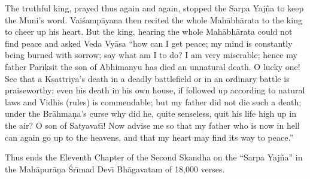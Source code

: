 The truthful king, prayed thus again and again, stopped the Sarpa Yaj\~na to keep the Muni's word. Vai\'samp\=ayana then recited the whole Mah\=abh\=arata to the king to cheer up his heart. But the king, hearing the whole Mah\=abh\=arata could not find peace and asked Veda Vy\=asa ``how can I get peace; my mind is constantly being burned with sorrow; say what am I to do? I am very miserable; hence my father Par\={\i}ksit the son of Abhimanyu has died an unnatural death. O lucky one! See that a K\d{s}attriya's death in a deadly battlefield or in an ordinary battle is praiseworthy; even his death in his own house, if followed up according to natural laws and Vidhis (rules) is commendable; but my father did not die such a death; under the Br\=ahma\d{n}a's curse why did he, quite senseless, quit his life high up in the air? O son of Satyavat\={\i}! Now advise me so that my father who is now in hell can again go up to the heavens, and that my heart may find its way to peace.''

Thus ends the Eleventh Chapter of the Second Skandha on the ``Sarpa Yaj\~na'' in the Mah\=apur\=a\d{n}a \'Sr\={\i}mad Dev\={\i} Bh\=agavatam of 18,000 verses.




